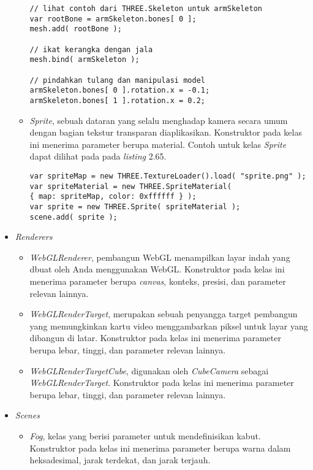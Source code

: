 \begin{itemize}
\begin{itemize}
\begin{lstlisting}[caption={Contoh penggunaan kelas {\it SkinnedMesh}.},captionpos=b]
// lihat contoh dari THREE.Skeleton untuk armSkeleton
var rootBone = armSkeleton.bones[ 0 ];
mesh.add( rootBone );

// ikat kerangka dengan jala
mesh.bind( armSkeleton );

// pindahkan tulang dan manipulasi model
armSkeleton.bones[ 0 ].rotation.x = -0.1;
armSkeleton.bones[ 1 ].rotation.x = 0.2;
\end{lstlisting}
	
	\item {\it Sprite}, sebuah dataran yang selalu menghadap kamera secara umum dengan bagian tekstur transparan diaplikasikan. Konstruktor pada kelas ini menerima parameter berupa material. Contoh untuk kelas {\it Sprite} dapat dilihat pada pada {\it listing} 2.65.
	
\begin{lstlisting}[caption={Contoh penggunaan kelas {\it Sprite}.},captionpos=b]
var spriteMap = new THREE.TextureLoader().load( "sprite.png" );
var spriteMaterial = new THREE.SpriteMaterial( 
{ map: spriteMap, color: 0xffffff } );
var sprite = new THREE.Sprite( spriteMaterial );
scene.add( sprite );
\end{lstlisting}
	
	\end{itemize}

\item \textit{Renderers}
	\begin{itemize}
	\item {\it WebGLRenderer}, pembangun WebGL menampilkan layar indah yang dbuat oleh Anda menggunakan WebGL. Konstruktor pada kelas ini menerima parameter berupa {\it canvas}, konteks, presisi, dan parameter relevan lainnya.
	
	\item {\it WebGLRenderTarget}, merupakan sebuah penyangga target pembangun yang memungkinkan kartu video menggambarkan piksel untuk layar yang dibangun di latar. Konstruktor pada kelas ini menerima parameter berupa lebar, tinggi, dan parameter relevan lainnya.
	
	\item {\it WebGLRenderTargetCube}, digunakan oleh {\it CubeCamera} sebagai {\it WebGLRenderTarget}. Konstruktor pada kelas ini menerima parameter berupa lebar, tinggi, dan parameter relevan lainnya.
	\end{itemize}
		
\item \textit{Scenes}

	\begin{itemize}
	\item {\it Fog}, kelas yang berisi parameter untuk mendefinisikan kabut. Konstruktor pada kelas ini menerima parameter berupa warna dalam heksadesimal, jarak terdekat, dan jarak terjauh.
	

\end{itemize}
\end{itemize}

